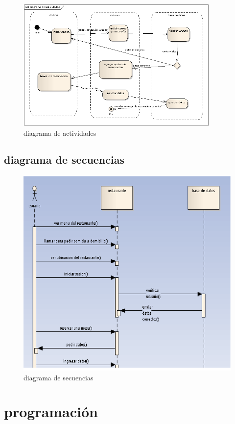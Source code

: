 \begin{figure}[H]
\caption{diagrama de actividades}
\centering
\includegraphics[width=10cm]{imagenes/actividades}

\end{figure}


\subsection{diagrama de secuencias}

\begin{figure}[H]
\caption{diagrama de secuencias}
\centering
\includegraphics[scale=0.80]{imagenes/secuencias}

\end{figure}




\section{programación}





